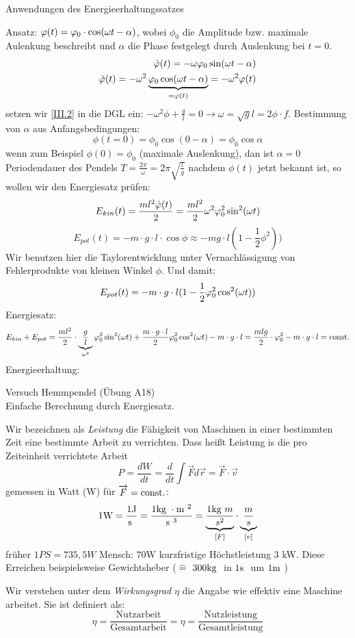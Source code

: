 \documentclass[a4paper,10pt]{scrartcl}
\begin{document}
\begin{seg}{Anwendungen des Energieerhaltungssatzes}
\begin{enumerate}[a)]
Ansatz: $\varphi(t)=\varphi_0\cdot \cos(\omega t-\alpha)$, wobei $\phi_0$ die Amplitude bzw. maximale Aulenkung beschreibt und $\alpha$ die Phase festgelegt durch Auslenkung bei $t=0$.
\begin{align}
 \dot {\varphi}(t)=-\omega\varphi_0\sin(\omega t - \alpha)\label{II.2}\\
 \ddot {\varphi}(t)=-\omega^2\underbrace{\varphi_0\cos(\omega t-\alpha)}_{=\varphi(t)}=-\omega^2\varphi(t)\label{III.2}
\end{align}
setzen wir \ref{III.2} in die DGL ein: $-\omega^2\phi+\frac{g}{l}=0\rightarrow \omega=\sqrt{g}{l}=2\phi\cdot f$.
Bestimmung von $\alpha$ aus Anfangsbedingungen:
\[
 \phi(t=0)=\phi_0\cos(0-\alpha)=\phi_0\cos\alpha
\]
wenn zum Beispiel $\phi(0)=\phi_0$ (maximale Auslenkung), dan ist $\alpha=0$ Periodendauer des Pendels $T=\frac{2\pi}{\omega}=2\pi\sqrt{\frac{l}{g}}$
nachdem $\phi(t)$ jetzt bekannt ist, so wollen wir den Energiesatz prüfen:
\[
 E_{kin}(t)=\frac{ml^2\dot {\varphi}(t)}2=\frac{ml^2}2 \omega^2 \varphi_0^2 \sin^2(\omega t)
\]
\[
 E_{pot}(t)=-m\cdot g\cdot l\cdot \cos{\phi}\approx-mg\cdot l(1-\frac{1}{2}\phi^2))
\]
Wir benutzen hier die Taylorentwicklung unter Vernachlässigung von Fehlerprodukte von kleinen Winkel $\phi$. Und damit:
\[
 E_{pot}(t)=-m\cdot g\cdot l(1-\frac 1 2 \varphi_0^2\cos^2(\omega t))
\]
Energiesatz:
\[
 E_{kin}+E_{pot}=\frac{ml^2}{2}\cdot \underbrace{\frac{g}{l}}_{\omega^2}\varphi_0^2 \sin^2(\omega t)+\frac{m\cdot g\cdot l}2 \varphi_0^2\cos^2(\omega t)-m\cdot g\cdot l=\frac{mlg}{2}\cdot \varphi_0^2-m\cdot g \cdot l = \text{const}.
\]
Energieerhaltung:\\
\end{enumerate}
\begin{seg}{Versuch Hemmpendel (Übung A18)}
\\
Einfache Berechnung durch Energiesatz. \\
\begin{df}
Wir bezeichnen als \emph{Leistung} die Fähigkeit von Maschinen in einer bestimmten Zeit eine bestimmte Arbeit zu verrichten. Dass heißt Leistung is die pro Zeiteinheit verrichtete Arbeit
\[
 P=\frac{dW}{dt}=\frac{d}{dt}\int \vec F d\vec{r}=\vec F\cdot \vec v
\]
gemessen in Watt (W) für $\overrightarrow{F}=\text{const}.$:
\[
 1\text{W}=\frac{1\text{J}}{\text{s }}=\frac{1\text{kg }\cdot \text{m }^2}{\text{s }^3}=\underbrace{\frac{1\text{kg } m}{s^2}}_{[F]}\cdot \underbrace{\frac{m}{s}}_{[v]}
\]
früher $1PS=735,5 W$ 
Mensch: $70\text{W}$ kurzfristige Höchstleistung $3$ kW. Diese Erreichen beispielsweise Gewichtsheber ($\hat=$ $300\text{kg }$ in $1\text{s }$ um $1\text{m }$)\\
\end{df}
\begin{df}[Wirkungsgrad]
Wir verstehen unter dem \emph{Wirkungsgrad} $\eta$ die Angabe wie effektiv eine Maschine arbeitet. Sie ist definiert als:
\[
 \eta=\frac{\text{Nutzarbeit}}{\text{Gesamtarbeit}}=\eta=\frac{\text{Nutzleistung}}{\text{Gesamtleistung}}
\]
\end{df}
\end{seg}


\end{seg}
\end{document}
